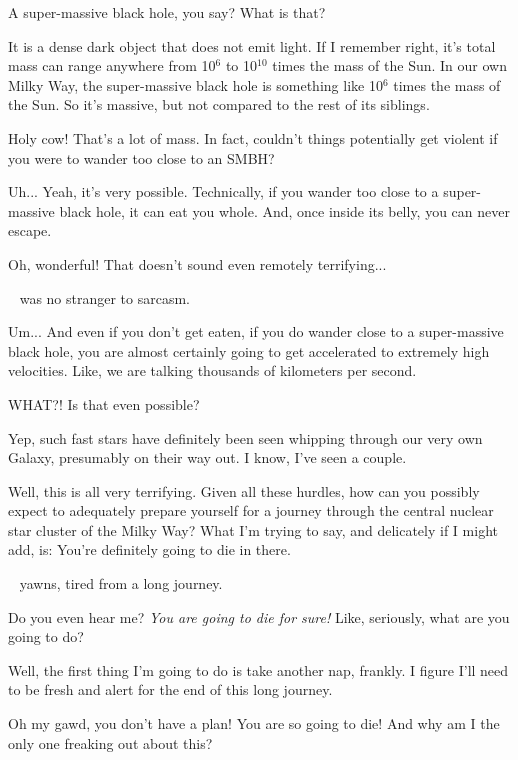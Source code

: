\documentclass[main.tex]{subfiles}
\begin{document}
\newpara \Dardanus A super-massive black hole, you say?  What is that?

\newpara \Electra It is a dense dark object that does not emit light.  If I remember right, it's total mass can range anywhere from 10$^6$ to 10$^{10}$ times the mass of the Sun.  In our own Milky Way, the super-massive black hole is something like 10$^6$ times the mass of the Sun.  So it's massive, but not compared to the rest of its siblings.

\newpara \Dardanus Holy cow!  That's a lot of mass.  In fact, couldn't things potentially get violent if you were to wander too close to an SMBH?

\newpara \Electra Uh... Yeah, it's very possible.  Technically, if you wander too close to a super-massive black hole, it can eat you whole.  And, once inside its belly, you can never escape.

\newpara \Dardanus  Oh, wonderful!  That doesn't sound even remotely terrifying...

\newpara \nar \rmdardanus~ was no stranger to sarcasm.

\newpara \Electra Um... And even if you don't get eaten, if you do wander close to a super-massive black hole, you are almost certainly going to get accelerated to extremely high velocities.  Like, we are talking thousands of kilometers per second.

\newpara \Dardanus  WHAT?!  Is that even possible?

\newpara \Electra  Yep, such fast stars have definitely been seen whipping through our very own Galaxy, presumably on their way out.  I know, I've seen a couple.

\newpara \Dardanus Well, this is all very terrifying.  Given all these hurdles, how can you possibly expect to adequately prepare yourself for a journey through the central nuclear star cluster of the Milky Way?  What I'm trying to say, and delicately if I might add, is:  You're definitely going to die in there.

\newpara \nar \rmelectra~ yawns, tired from a long journey.

\newpara \Dardanus  Do you even hear me?  \textit{You are going to die for sure!}  Like, seriously, what are you going to do?

\newpara \Electra Well, the first thing I'm going to do is take another nap, frankly.  I figure I'll need to be fresh and alert for the end of this long journey.

\newpara \Dardanus Oh my gawd, you don't have a plan!  You are so going to die!  And why am I the only one freaking out about this?
\end{document}
